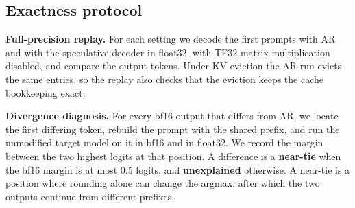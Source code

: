 \subsection{Exactness protocol}
\label{sec:protocol}

\noindent{}\textbf{Full-precision replay.} 
For each setting we decode the first prompts with AR and with the speculative decoder in float32, with TF32 matrix multiplication disabled, and compare the output tokens.
Under KV eviction the AR run evicts the same entries, so the replay also checks that the eviction keeps the cache bookkeeping exact.

\noindent\textbf{Divergence diagnosis.}
For every bf16 output that differs from AR, we locate the first differing token, rebuild the prompt with the shared prefix, and run the unmodified target model on it in bf16 and in float32.
We record the margin between the two highest logits at that position.
A difference is a \textbf{near-tie} when the bf16 margin is at most 0.5 logits, and \textbf{unexplained} otherwise.
A near-tie is a position where rounding alone can change the argmax, after which the two outputs continue from different prefixes.
